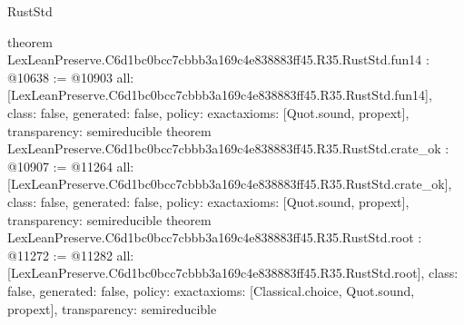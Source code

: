 \begin{lexlean}{RustStd}
\begin{coremodule}
{}
theorem LexLeanPreserve.C6d1bc0bcc7cbbb3a169c4e838883ff45.R35.RustStd.fun14 : @10638 := @10903 {
  all: [LexLeanPreserve.C6d1bc0bcc7cbbb3a169c4e838883ff45.R35.RustStd.fun14],
  class: false,
  generated: false,
  policy: exact{axioms: [Quot.sound, propext]},
  transparency: semireducible
}
theorem LexLeanPreserve.C6d1bc0bcc7cbbb3a169c4e838883ff45.R35.RustStd.crate_ok : @10907 := @11264 {
  all: [LexLeanPreserve.C6d1bc0bcc7cbbb3a169c4e838883ff45.R35.RustStd.crate_ok],
  class: false,
  generated: false,
  policy: exact{axioms: [Quot.sound, propext]},
  transparency: semireducible
}
theorem LexLeanPreserve.C6d1bc0bcc7cbbb3a169c4e838883ff45.R35.RustStd.root : @11272 := @11282 {
  all: [LexLeanPreserve.C6d1bc0bcc7cbbb3a169c4e838883ff45.R35.RustStd.root],
  class: false,
  generated: false,
  policy: exact{axioms: [Classical.choice, Quot.sound, propext]},
  transparency: semireducible
}


\end{coremodule}
\end{lexlean}
